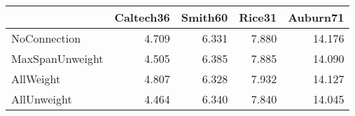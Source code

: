 \begin{tabular}{lrrrr}
\toprule
{} & Caltech36 & Smith60 & Rice31 & Auburn71 \\
\midrule
NoConnection    &     4.709 &   6.331 &  7.880 &   14.176 \\
MaxSpanUnweight &     4.505 &   6.385 &  7.885 &   14.090 \\
AllWeight       &     4.807 &   6.328 &  7.932 &   14.127 \\
AllUnweight     &     4.464 &   6.340 &  7.840 &   14.045 \\
\bottomrule
\end{tabular}
